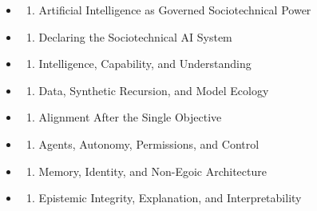 \documentclass[
  11pt,
]{article}
\providecommand{\tightlist}{%
  \setlength{\itemsep}{0pt}\setlength{\parskip}{0pt}}
\begin{document}
\begin{itemize}
\tightlist
\item
  \begin{enumerate}
  \def\labelenumi{\arabic{enumi}.}
  \tightlist
  \item
    Artificial Intelligence as Governed Sociotechnical Power
  \end{enumerate}
\item
  \begin{enumerate}
  \def\labelenumi{\arabic{enumi}.}
  \setcounter{enumi}{1}
  \tightlist
  \item
    Declaring the Sociotechnical AI System
  \end{enumerate}
\item
  \begin{enumerate}
  \def\labelenumi{\arabic{enumi}.}
  \setcounter{enumi}{2}
  \tightlist
  \item
    Intelligence, Capability, and Understanding
  \end{enumerate}
\item
  \begin{enumerate}
  \def\labelenumi{\arabic{enumi}.}
  \setcounter{enumi}{3}
  \tightlist
  \item
    Data, Synthetic Recursion, and Model Ecology
  \end{enumerate}
\item
  \begin{enumerate}
  \def\labelenumi{\arabic{enumi}.}
  \setcounter{enumi}{4}
  \tightlist
  \item
    Alignment After the Single Objective
  \end{enumerate}
\item
  \begin{enumerate}
  \def\labelenumi{\arabic{enumi}.}
  \setcounter{enumi}{5}
  \tightlist
  \item
    Agents, Autonomy, Permissions, and Control
  \end{enumerate}
\item
  \begin{enumerate}
  \def\labelenumi{\arabic{enumi}.}
  \setcounter{enumi}{6}
  \tightlist
  \item
    Memory, Identity, and Non-Egoic Architecture
  \end{enumerate}
\item
  \begin{enumerate}
  \def\labelenumi{\arabic{enumi}.}
  \setcounter{enumi}{7}
  \tightlist
  \item
    Epistemic Integrity, Explanation, and Interpretability

\end{enumerate}
\end{itemize}
\end{document}
